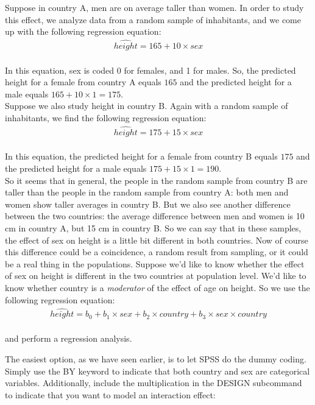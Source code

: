 \documentclass[]{book}\usepackage[]{graphicx}\usepackage[]{color}
\begin{document}
Suppose in country A, men are on average taller than women. In order to study this effect, we analyze data from a random sample of inhabitants, and we come up with the following regression equation:
\\
\begin{eqnarray} 
\widehat{height} = 165 + 10  \times sex  \nonumber
\end{eqnarray}
\\
In this equation, sex is coded 0 for females, and 1 for males. So, the predicted height for a female from country A equals $165$ and the predicted height for a male equals $165 + 10 \times 1 = 175$.\\


Suppose we also study height in country B. Again with a random sample of inhabitants, we find the following regression equation:
\\
\begin{eqnarray} 
\widehat{height} = 175 + 15  \times sex  \nonumber
\end{eqnarray}
\\
In this equation, the predicted height for a female from country B equals $175$ and the predicted height for a male equals $175 + 15 \times 1 = 190$.\\

So it seems that in general, the people in the random sample from country B are taller than the people in the random sample from country A: both men and women show taller averages in country B. But we also see another difference between the two countries: the average difference between men and women is 10 cm in country A, but 15 cm in country B. So we can say that in these samples, the effect of sex on height is a little bit different in both countries. Now of course this difference could be a coincidence, a random result from sampling, or it could be a real thing in the populations. Suppose we'd like to know whether the effect of sex on height is different in the two countries at population level. We'd like to know whether country is a \textit{moderator} of the effect of age on height. So we use the following regression equation:
\\
\begin{eqnarray} 
\widehat{height} = b_0 + b_1  \times sex + b_2 \times country +  b_3 \times sex \times country  \nonumber
\end{eqnarray}
\\
and perform a regression analysis. 

The easiest option, as we have seen earlier, is to let SPSS do the dummy coding. Simply use the BY keyword to indicate that both country and sex are categorical variables. Additionally, include the multiplication in the DESIGN subcommand to indicate that you want to model an interaction effect:
\end{document}
